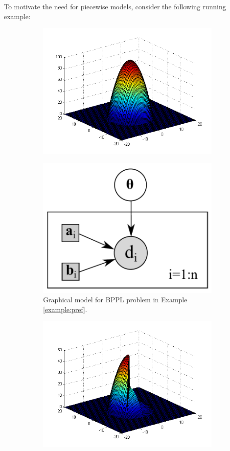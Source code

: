 To motivate the need for piecewise models, consider the following running example:
\begin{figure}%
\centering
\begin{subfigure}{.2\textwidth}
  \centering
  \includegraphics[width=.99\textwidth]{pic/bpplPriorII.png}
  \label{fig:prior2d}
\end{subfigure}%
\begin{subfigure}{.58\textwidth}
\centering
\includegraphics[width=.24\textwidth]{pic/pref2w.pdf}
\caption{\footnotesize Graphical model for BPPL problem in Example \ref{example:pref}. }
\end{subfigure}
\begin{subfigure}{.2\textwidth}
  \centering
  \includegraphics[width=.99\textwidth]{pic/bpplPosteriorII.png}
  \label{fig:prior2d}
\end{subfigure}%
\label{fig:pref}
\end{figure}
